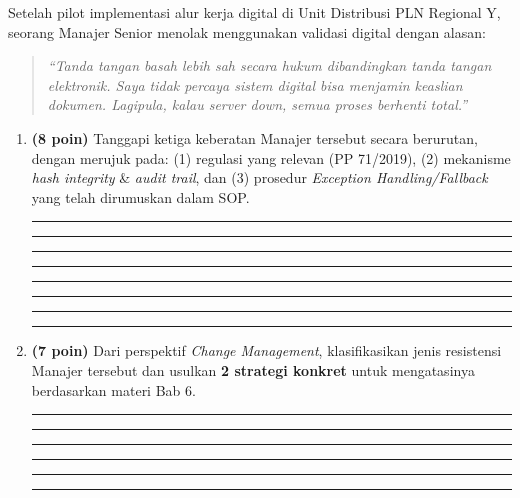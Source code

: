\documentclass[12pt,a4paper]{report}
\begin{document}
\vspace{0.5cm}

\begin{plnbox}
\small
Setelah pilot implementasi alur kerja digital di Unit Distribusi PLN Regional Y, seorang Manajer Senior menolak menggunakan validasi digital dengan alasan:

\begin{quote}
\textit{``Tanda tangan basah lebih sah secara hukum dibandingkan tanda tangan elektronik. Saya tidak percaya sistem digital bisa menjamin keaslian dokumen. Lagipula, kalau server \textit{down}, semua proses berhenti total.''}
\end{quote}
\end{plnbox}

\vspace{0.3cm}

\begin{enumerate}[leftmargin=*, label=\textbf{D2.\alph*}]
    \item \textbf{(8 poin)} Tanggapi ketiga keberatan Manajer tersebut secara berurutan, dengan merujuk pada: (1) regulasi yang relevan (PP 71/2019), (2) mekanisme \textit{hash integrity} \& \textit{audit trail}, dan (3) prosedur \textit{Exception Handling/Fallback} yang telah dirumuskan dalam SOP.

\vspace{0.2cm}
\noindent\rule{\textwidth}{0.3pt}
\vspace{0.5cm}
\noindent\rule{\textwidth}{0.3pt}
\vspace{0.5cm}
\noindent\rule{\textwidth}{0.3pt}
\vspace{0.5cm}
\noindent\rule{\textwidth}{0.3pt}
\vspace{0.5cm}
\noindent\rule{\textwidth}{0.3pt}
\vspace{0.5cm}
\noindent\rule{\textwidth}{0.3pt}
\vspace{0.5cm}
\noindent\rule{\textwidth}{0.3pt}
\vspace{0.5cm}
\noindent\rule{\textwidth}{0.3pt}

    \item \textbf{(7 poin)} Dari perspektif \textit{Change Management}, klasifikasikan jenis resistensi Manajer tersebut dan usulkan \textbf{2 strategi konkret} untuk mengatasinya berdasarkan materi Bab 6.

\vspace{0.2cm}
\noindent\rule{\textwidth}{0.3pt}
\vspace{0.5cm}
\noindent\rule{\textwidth}{0.3pt}
\vspace{0.5cm}
\noindent\rule{\textwidth}{0.3pt}
\vspace{0.5cm}
\noindent\rule{\textwidth}{0.3pt}
\vspace{0.5cm}
\noindent\rule{\textwidth}{0.3pt}
\vspace{0.5cm}
\noindent\rule{\textwidth}{0.3pt}
\end{enumerate}
\end{document}
